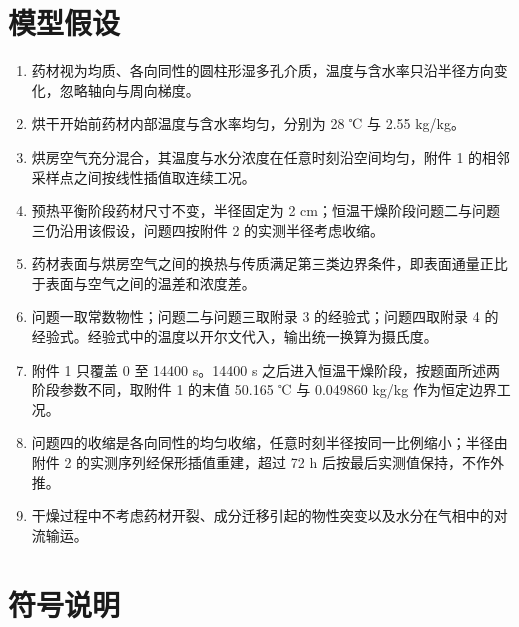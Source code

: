 \documentclass[12pt,a4paper]{article}
\begin{document}
\section{模型假设}

\begin{enumerate}
    \item 药材视为均质、各向同性的圆柱形湿多孔介质，温度与含水率只沿半径方向变化，忽略轴向与周向梯度。
    \item 烘干开始前药材内部温度与含水率均匀，分别为 28 ℃ 与 2.55 kg/kg。
    \item 烘房空气充分混合，其温度与水分浓度在任意时刻沿空间均匀，附件 1 的相邻采样点之间按线性插值取连续工况。
    \item 预热平衡阶段药材尺寸不变，半径固定为 2 cm；恒温干燥阶段问题二与问题三仍沿用该假设，问题四按附件 2 的实测半径考虑收缩。
    \item 药材表面与烘房空气之间的换热与传质满足第三类边界条件，即表面通量正比于表面与空气之间的温差和浓度差。
    \item 问题一取常数物性；问题二与问题三取附录 3 的经验式；问题四取附录 4 的经验式。经验式中的温度以开尔文代入，输出统一换算为摄氏度。
    \item 附件 1 只覆盖 0 至 14400 s。14400 s 之后进入恒温干燥阶段，按题面所述两阶段参数不同，取附件 1 的末值 50.165 ℃ 与 0.049860 kg/kg 作为恒定边界工况。
    \item 问题四的收缩是各向同性的均匀收缩，任意时刻半径按同一比例缩小；半径由附件 2 的实测序列经保形插值重建，超过 72 h 后按最后实测值保持，不作外推。
    \item 干燥过程中不考虑药材开裂、成分迁移引起的物性突变以及水分在气相中的对流输运。
\end{enumerate}

\section{符号说明}
\end{document}
